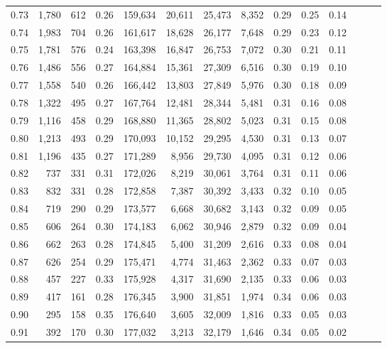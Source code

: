 \begin{tabular}{rrrrrrrrrrrrrr}
0.73 &  1,780 &  612 &  0.26 &  159,634 &   20,611 &  25,473 &   8,352 &  0.29 &  0.25 &      0.14 \\
0.74 &  1,983 &  704 &  0.26 &  161,617 &   18,628 &  26,177 &   7,648 &  0.29 &  0.23 &      0.12 \\
0.75 &  1,781 &  576 &  0.24 &  163,398 &   16,847 &  26,753 &   7,072 &  0.30 &  0.21 &      0.11 \\
0.76 &  1,486 &  556 &  0.27 &  164,884 &   15,361 &  27,309 &   6,516 &  0.30 &  0.19 &      0.10 \\
0.77 &  1,558 &  540 &  0.26 &  166,442 &   13,803 &  27,849 &   5,976 &  0.30 &  0.18 &      0.09 \\
0.78 &  1,322 &  495 &  0.27 &  167,764 &   12,481 &  28,344 &   5,481 &  0.31 &  0.16 &      0.08 \\
0.79 &  1,116 &  458 &  0.29 &  168,880 &   11,365 &  28,802 &   5,023 &  0.31 &  0.15 &      0.08 \\
0.80 &  1,213 &  493 &  0.29 &  170,093 &   10,152 &  29,295 &   4,530 &  0.31 &  0.13 &      0.07 \\
0.81 &  1,196 &  435 &  0.27 &  171,289 &    8,956 &  29,730 &   4,095 &  0.31 &  0.12 &      0.06 \\
0.82 &    737 &  331 &  0.31 &  172,026 &    8,219 &  30,061 &   3,764 &  0.31 &  0.11 &      0.06 \\
0.83 &    832 &  331 &  0.28 &  172,858 &    7,387 &  30,392 &   3,433 &  0.32 &  0.10 &      0.05 \\
0.84 &    719 &  290 &  0.29 &  173,577 &    6,668 &  30,682 &   3,143 &  0.32 &  0.09 &      0.05 \\
0.85 &    606 &  264 &  0.30 &  174,183 &    6,062 &  30,946 &   2,879 &  0.32 &  0.09 &      0.04 \\
0.86 &    662 &  263 &  0.28 &  174,845 &    5,400 &  31,209 &   2,616 &  0.33 &  0.08 &      0.04 \\
0.87 &    626 &  254 &  0.29 &  175,471 &    4,774 &  31,463 &   2,362 &  0.33 &  0.07 &      0.03 \\
0.88 &    457 &  227 &  0.33 &  175,928 &    4,317 &  31,690 &   2,135 &  0.33 &  0.06 &      0.03 \\
0.89 &    417 &  161 &  0.28 &  176,345 &    3,900 &  31,851 &   1,974 &  0.34 &  0.06 &      0.03 \\
0.90 &    295 &  158 &  0.35 &  176,640 &    3,605 &  32,009 &   1,816 &  0.33 &  0.05 &      0.03 \\
0.91 &    392 &  170 &  0.30 &  177,032 &    3,213 &  32,179 &   1,646 &  0.34 &  0.05 &      0.02 \\

\end{tabular}
